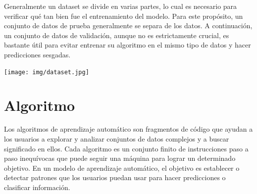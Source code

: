 \documentclass[runningheads,a4paper]{llncs}
\begin{document}
Generalmente un dataset se divide en varias partes, lo cual es necesario para verificar qu\'e tan bien fue el entrenamiento del modelo. Para este prop\'osito, un conjunto de datos de prueba generalmente se separa de los datos. A continuaci\'on, un conjunto de datos de validaci\'on, aunque no es estrictamente crucial, es bastante \'util para evitar entrenar su algoritmo en el mismo tipo de datos y hacer predicciones sesgadas.\\
\begin{center}
\texttt{[image: img/dataset.jpg]}
\end{center}

\section{Algoritmo}
Los algoritmos de aprendizaje autom\'atico son fragmentos de c\'odigo que ayudan a los usuarios a explorar y analizar conjuntos de datos complejos y a buscar significado en ellos. Cada algoritmo es un conjunto finito de instrucciones paso a paso inequ\'ivocas que puede seguir una m\'aquina para lograr un determinado objetivo. En un modelo de aprendizaje autom\'atico, el objetivo es establecer o detectar patrones que los usuarios puedan usar para hacer predicciones o clasificar información.\\
\end{document}

